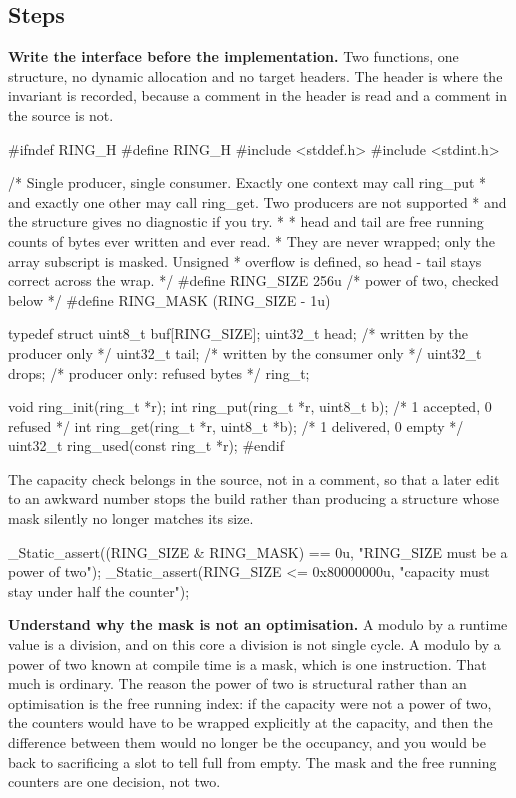 \subsection*{Steps}

\begin{steps}
\item \textbf{Write the interface before the implementation.} Two functions,
one structure, no dynamic allocation and no target headers. The header is where
the invariant is recorded, because a comment in the header is read and a comment
in the source is not.
\begin{ccode}
#ifndef RING_H
#define RING_H
#include <stddef.h>
#include <stdint.h>

/* Single producer, single consumer. Exactly one context may call ring_put
 * and exactly one other may call ring_get. Two producers are not supported
 * and the structure gives no diagnostic if you try.
 *
 * head and tail are free running counts of bytes ever written and ever read.
 * They are never wrapped; only the array subscript is masked. Unsigned
 * overflow is defined, so head - tail stays correct across the wrap.
 */
#define RING_SIZE 256u                    /* power of two, checked below */
#define RING_MASK (RING_SIZE - 1u)

typedef struct {
    uint8_t  buf[RING_SIZE];
    uint32_t head;                        /* written by the producer only */
    uint32_t tail;                        /* written by the consumer only */
    uint32_t drops;                       /* producer only: refused bytes  */
} ring_t;

void     ring_init(ring_t *r);
int      ring_put(ring_t *r, uint8_t b);  /* 1 accepted, 0 refused */
int      ring_get(ring_t *r, uint8_t *b); /* 1 delivered, 0 empty  */
uint32_t ring_used(const ring_t *r);
#endif
\end{ccode}
The capacity check belongs in the source, not in a comment, so that a later
edit to an awkward number stops the build rather than producing a structure
whose mask silently no longer matches its size.
\begin{ccode}
_Static_assert((RING_SIZE & RING_MASK) == 0u, "RING_SIZE must be a power of two");
_Static_assert(RING_SIZE <= 0x80000000u, "capacity must stay under half the counter");
\end{ccode}

\item \textbf{Understand why the mask is not an optimisation.} A modulo by a
runtime value is a division, and on this core a division is not single cycle. A
modulo by a power of two known at compile time is a mask, which is one
instruction. That much is ordinary. The reason the power of two is structural
rather than an optimisation is the free running index: if the capacity were not
a power of two, the counters would have to be wrapped explicitly at the
capacity, and then the difference between them would no longer be the
occupancy, and you would be back to sacrificing a slot to tell full from empty.
The mask and the free running counters are one decision, not two.


\end{steps}
